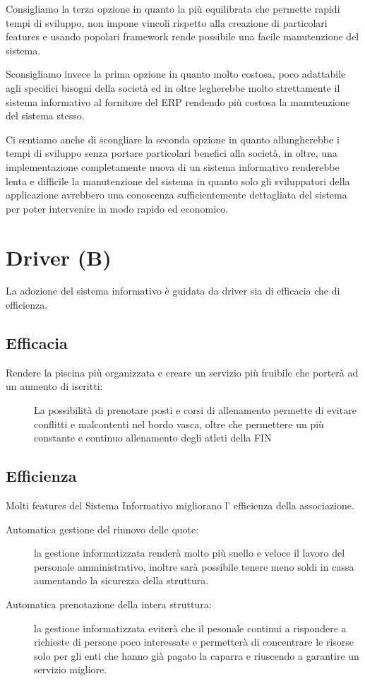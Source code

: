 \documentclass[11pt]{article} %
\begin{document}
Consigliamo la terza opzione in quanto la più equilibrata che permette rapidi tempi di sviluppo, non impone vincoli rispetto alla creazione di particolari features e usando popolari framework rende possibile una facile manutenzione del sistema.

Sconsigliamo invece la prima opzione in quanto molto costosa, poco adattabile agli specifici bisogni della società ed in oltre legherebbe molto strettamente il sistema informativo al fornitore del ERP rendendo più costosa la manutenzione del sistema stesso.

Ci sentiamo anche di scongliare la seconda opzione in quanto allungherebbe i tempi di sviluppo senza portare particolari benefici alla società, in oltre, una implementazione completamente nuova di un sistema informativo renderebbe lenta e difficile la manutenzione del sistema in quanto solo gli sviluppatori della applicazione avrebbero una conoscenza sufficientemente dettagliata del sistema per poter intervenire in modo rapido ed economico.

\section{Driver (B)}

La adozione del sistema informativo è guidata da driver sia di efficacia che di efficienza.

\subsection{Efficacia}

\begin{description}
	\item[Rendere la piscina più organizzata e creare un servizio più fruibile che porterà ad un aumento di iscritti: ]La possibilità di prenotare posti e corsi di allenamento permette di evitare conflitti e malcontenti nel bordo vasca, oltre che permettere un più constante e continuo allenamento degli atleti della FIN
\end{description}
\subsection{Efficienza}

Molti features del Sistema Informativo migliorano l' efficienza della associazione.

\begin{description}
	\item[Automatica gestione del rinnovo delle quote:] la gestione informatizzata renderà molto più snello e veloce il lavoro del personale amministrativo, inoltre sarà possibile tenere meno soldi in cassa aumentando la sicurezza della struttura. 
	\item[Automatica prenotazione della intera struttura:] la gestione informatizzata eviterà che il pesonale continui a rispondere a richieste di persone poco interessate e permetterà di concentrare le risorse solo per gli enti che hanno già pagato la caparra e riuscendo a garantire un servizio migliore.
\end{description}
\end{document}
